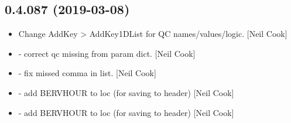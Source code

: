 \documentclass[a4paper,10pt,english]{report}
\begin{document}
\subsection{0.4.087 (2019-03-08)}
\label{\detokenize{misc/changelog:id173}}\begin{itemize}
\item {} 
Change AddKey \textendash{}\textgreater{} AddKey1DList for QC names/values/logic. {[}Neil Cook{]}

\item {} 
 - correct qc missing from param dict. {[}Neil
Cook{]}

\item {} 
 - fix missed comma in list. {[}Neil Cook{]}

\item {} 
 - add BERVHOUR to loc (for saving to header) {[}Neil Cook{]}

\item {} 
 - add BERVHOUR to loc (for saving to header) {[}Neil Cook{]}

\end{itemize}
\end{document}
